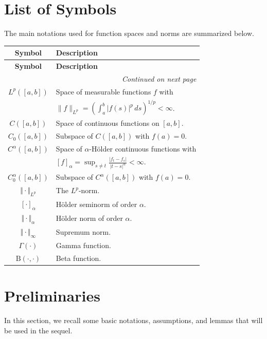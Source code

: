 \documentclass[preprint,12pt]{elsarticle}
\theoremstyle{definition}  %
\theoremstyle{plain}  %
\begin{document}
\section*{List of Symbols}
The main notations used for function spaces and norms are summarized below.
\begin{longtable}[htbp]{cl}

\toprule
\textbf{Symbol} & \textbf{Description} \\
\midrule
\endfirsthead

\toprule
\textbf{Symbol} & \textbf{Description} \\
\midrule
\endhead

\midrule
\multicolumn{2}{r}{\textit{Continued on next page}} \\
\endfoot

\bottomrule
\endlastfoot

$L^p([a,b])$ & Space of measurable functions $f$ with \\
& $\displaystyle \|f\|_{L^p} = \left(\int_a^b |f(s)|^p\,ds\right)^{1/p} < \infty$. \\[0.4em]
$C([a,b])$ & Space of continuous functions on $[a,b]$. \\[0.4em]
$C_0([a,b])$ & Subspace of $C([a,b])$ with $f(a) = 0$. \\[0.4em]
$C^\alpha([a,b])$ & Space of $\alpha$-H\"older continuous functions with \\
& $\displaystyle [f]_\alpha = \sup_{s \ne t} \frac{|f_t - f_s|}{|t-s|^\alpha} < \infty$. \\[0.4em]
$C_0^\alpha([a,b])$ & Subspace of $C^\alpha([a,b])$ with $f(a) = 0$. \\[0.4em]
$\Vert \cdot \Vert_{L^p}$ & The $L^p$-norm. \\
$[\cdot]_\alpha$ & H\"older seminorm of order $\alpha$. \\
$\Vert \cdot \Vert_\alpha$ & H\"older norm of order $\alpha$. \\
$\Vert \cdot \Vert_\infty$ & Supremum norm. \\
$\Gamma(\cdot)$ & Gamma function. \\
$\mathrm{B}(\cdot,\cdot)$ & Beta function. \\
\end{longtable}

\section{Preliminaries}  \label{perliminary}
In this section, we recall some basic notations, assumptions, and lemmas that will be used in the sequel.
\end{document}
